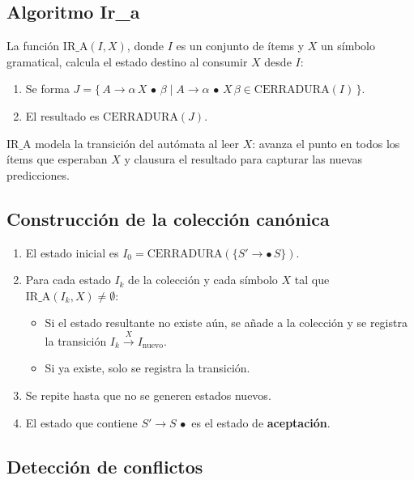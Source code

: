 \subsection*{Algoritmo Ir\_a}

La función $\mathrm{IR\_A}(I, X)$, donde $I$ es un conjunto de ítems y $X$ un símbolo
gramatical, calcula el estado destino al consumir $X$ desde $I$:

\begin{enumerate}
  \item Se forma $J = \{\,A \to \alpha\,X\,\bullet\,\beta \mid
        A \to \alpha\,\bullet\,X\,\beta \in \mathrm{CERRADURA}(I)\,\}$.
  \item El resultado es $\mathrm{CERRADURA}(J)$.
\end{enumerate}

$\mathrm{IR\_A}$ modela la transición del autómata al leer $X$: avanza el punto en todos los
ítems que esperaban $X$ y clausura el resultado para capturar las nuevas predicciones.

\subsection*{Construcción de la colección canónica}

\begin{enumerate}
  \item El estado inicial es $I_0 = \mathrm{CERRADURA}(\{S' \to \bullet\,S\})$.
  \item Para cada estado $I_k$ de la colección y cada símbolo $X$ tal que
        $\mathrm{IR\_A}(I_k, X) \neq \emptyset$:
        \begin{itemize}
          \item Si el estado resultante no existe aún, se añade a la colección y se
                registra la transición $I_k \xrightarrow{X} I_\text{nuevo}$.
          \item Si ya existe, solo se registra la transición.
        \end{itemize}
  \item Se repite hasta que no se generen estados nuevos.
  \item El estado que contiene $S' \to S\,\bullet$ es el estado de \textbf{aceptación}.
\end{enumerate}

\subsection*{Detección de conflictos}

